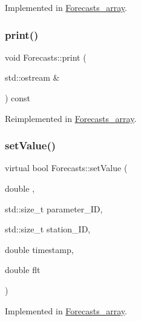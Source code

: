 Implemented in \mbox{\hyperlink{class_forecasts__array_a38f7b890af0947e0d2022ce5bc5bb514}{Forecasts\+\_\+array}}.

\mbox{\label{class_forecasts_addb1f75f0dc6833c466453c51256812c}} 
\subsubsection{\texorpdfstring{print()}{print()}}
{\footnotesize\ttfamily void Forecasts\+::print (\begin{DoxyParamCaption}\item[{std\+::ostream \&}]{ }\end{DoxyParamCaption}) const\hspace{0.3cm}{\ttfamily [virtual]}}



Reimplemented in \mbox{\hyperlink{class_forecasts__array_a56985347f516340034b29dc4cdda87b1}{Forecasts\+\_\+array}}.

\mbox{\label{class_forecasts_ac3ba966466c340deaecf83fa239bef6d}} 
\subsubsection{\texorpdfstring{set\+Value()}{setValue()}}
{\footnotesize\ttfamily virtual bool Forecasts\+::set\+Value (\begin{DoxyParamCaption}\item[{double}]{,  }\item[{std\+::size\+\_\+t}]{parameter\+\_\+\+ID,  }\item[{std\+::size\+\_\+t}]{station\+\_\+\+ID,  }\item[{double}]{timestamp,  }\item[{double}]{flt }\end{DoxyParamCaption})\hspace{0.3cm}{\ttfamily [pure virtual]}}



Implemented in \mbox{\hyperlink{class_forecasts__array_a3b5557b58352d846c4fddc095f87589d}{Forecasts\+\_\+array}}.

\mbox{\label{class_forecasts_a2f249a4ec8571dcf2cfc23f06b942ad9}} 
